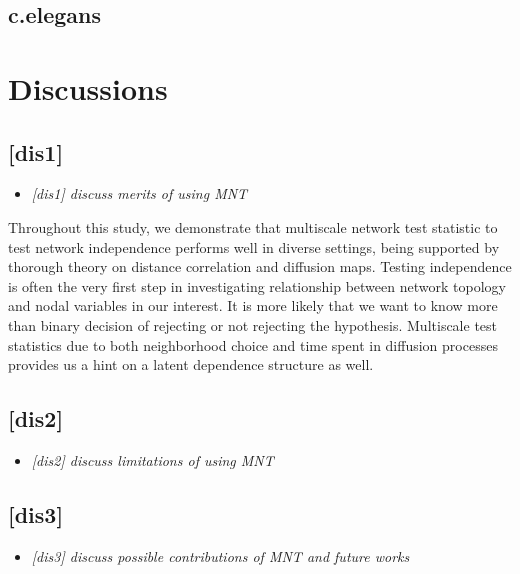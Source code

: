 \documentclass[12pt]{article}
\theoremstyle{definition}
\begin{document}
\subsection{c.elegans}


\newpage
\section{Discussions}

\subsection{[dis1]}
\begin{itemize}
	\item {\it  [dis1] discuss merits of using MNT   \/}
\end{itemize}

Throughout this study, we demonstrate that multiscale network test statistic to test network independence performs well in diverse settings, being supported by thorough theory on distance correlation and diffusion maps. 
Testing independence is often the very first step in investigating relationship between network topology and nodal variables in our interest. It is more likely that we want to know more than binary decision of rejecting or not rejecting the hypothesis. Multiscale test statistics due to both neighborhood choice and time spent in diffusion processes provides us a hint on a latent dependence structure as well.  


\subsection{[dis2]}
\begin{itemize}
	\item {\it  [dis2] discuss limitations of using MNT   \/}
\end{itemize}


\subsection{[dis3]}
\begin{itemize}
	\item {\it  [dis3] discuss possible contributions of MNT and future works  \/}
\end{itemize}



\newpage
\end{document}

